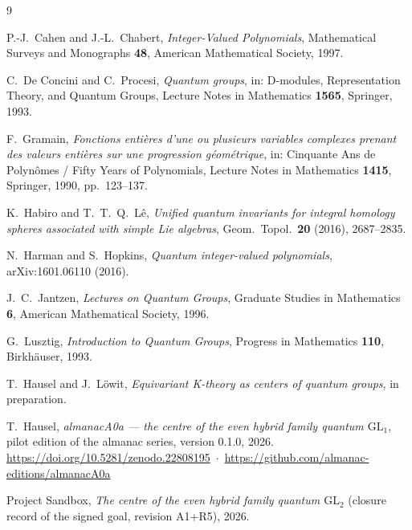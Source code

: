 \documentclass[11pt]{article}
\begin{document}
\begin{thebibliography}{9}

P.-J.~Cahen and J.-L.~Chabert,
\emph{Integer-Valued Polynomials},
Mathematical Surveys and Monographs \textbf{48}, American Mathematical Society, 1997.

C.~De Concini and C.~Procesi,
\emph{Quantum groups},
in: D-modules, Representation Theory, and Quantum Groups,
Lecture Notes in Mathematics \textbf{1565}, Springer, 1993.

F.~Gramain,
\emph{Fonctions enti\`eres d'une ou plusieurs variables complexes prenant des valeurs enti\`eres
sur une progression g\'eom\'etrique},
in: Cinquante Ans de Polyn\^omes / Fifty Years of Polynomials,
Lecture Notes in Mathematics \textbf{1415}, Springer, 1990, pp.~123--137.

K.~Habiro and T.~T.~Q.~L\^e,
\emph{Unified quantum invariants for integral homology spheres associated with simple Lie
algebras},
Geom.\ Topol.\ \textbf{20} (2016), 2687--2835.

N.~Harman and S.~Hopkins,
\emph{Quantum integer-valued polynomials},
arXiv:1601.06110 (2016).

J.~C.~Jantzen,
\emph{Lectures on Quantum Groups},
Graduate Studies in Mathematics \textbf{6}, American Mathematical Society, 1996.

G.~Lusztig,
\emph{Introduction to Quantum Groups},
Progress in Mathematics \textbf{110}, Birkh\"auser, 1993.

T.~Hausel and J.~L\"owit,
\emph{Equivariant K-theory as centers of quantum groups}, in preparation.

T.~Hausel, \emph{almanacA0a --- the centre of the even hybrid family quantum $\mathrm{GL}_1$},
pilot edition of the almanac series, version 0.1.0, 2026.
\url{https://doi.org/10.5281/zenodo.22808195} \,$\cdot$\, \url{https://github.com/almanac-editions/almanacA0a}

Project Sandbox,
\emph{The centre of the even hybrid family quantum $\mathrm{GL}_2$}
(closure record of the signed goal, revision A1+R5), 2026.

\end{thebibliography}
\end{document}
